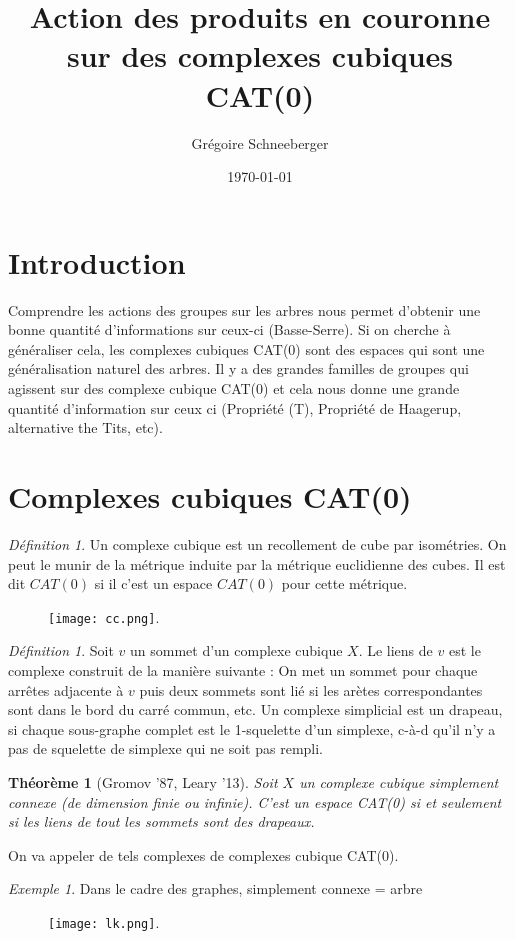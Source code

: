\documentclass[a4paper]{article}
\title{Action des produits en couronne sur des complexes cubiques CAT(0)}
\author{Grégoire Schneeberger}
\date{\today \quad \currenttime}
\newtheorem{thm}[lem]{Théorème}
\theoremstyle{remark}%
\newtheorem{defn}[lem]{Définition}
\newtheorem{exmp}[lem]{Exemple}
\begin{document}
\maketitle
\section{Introduction}
Comprendre les actions des groupes sur les arbres nous permet d'obtenir une bonne quantité d'informations sur ceux-ci (Basse-Serre). Si on cherche à généraliser cela, les complexes cubiques CAT(0) sont des espaces qui sont une généralisation naturel des arbres. Il y a des grandes familles de groupes qui agissent sur des complexe cubique CAT(0) et cela nous donne une grande quantité d'information sur ceux ci (Propriété (T), Propriété de Haagerup, alternative the Tits, etc). 
%
%
\section{Complexes cubiques CAT(0)}
\begin{defn}
Un complexe cubique est un recollement de cube par isométries. On peut le munir de la métrique induite par la métrique euclidienne des cubes. Il est dit $CAT(0)$ si il c'est un espace $CAT(0)$ pour cette métrique.
\end{defn}
%
 \begin{figure}[H]
 \centering
 \texttt{[image: cc.png]}.
\end{figure}
\begin{defn}
Soit $v$ un sommet d'un complexe cubique $X$. Le liens de $v$ est le complexe construit de la manière suivante : On met un sommet pour chaque arrêtes adjacente à $v$ puis deux sommets sont lié si les arètes correspondantes sont dans le bord du carré commun, etc. Un complexe simplicial est un drapeau, si chaque sous-graphe complet est le 1-squelette d'un simplexe, c-à-d qu'il n'y a pas de squelette de simplexe qui ne soit pas rempli. 
\end{defn}
%
\begin{thm}[Gromov '87, Leary '13]
Soit $X$ un complexe cubique simplement connexe (de dimension finie ou infinie). C'est un espace CAT(0) si et seulement si les liens de tout les sommets sont des drapeaux. 
\end{thm}
On va appeler de tels complexes de complexes cubique CAT(0). 
\begin{exmp}
\item Dans le cadre des graphes, simplement connexe = arbre
 \begin{figure}[H]
 \centering
 \texttt{[image: lk.png]}.
\end{figure}
\end{exmp}
\end{document}
